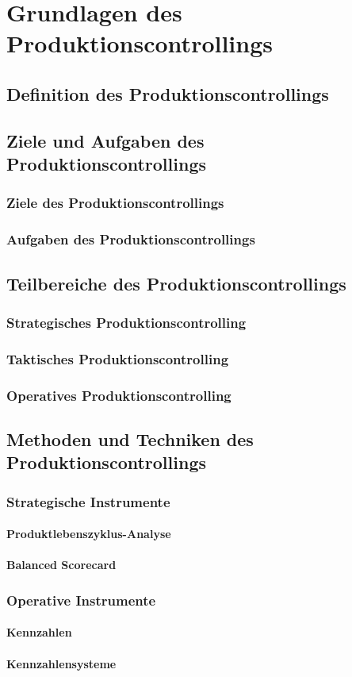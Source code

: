 \section{Grundlagen des Produktionscontrollings}
\subsection{Definition des Produktionscontrollings}
\subsection{Ziele und Aufgaben des Produktionscontrollings}
\subsubsection{Ziele des Produktionscontrollings}
\subsubsection{Aufgaben des Produktionscontrollings}
\subsection{Teilbereiche des Produktionscontrollings}
\subsubsection{Strategisches Produktionscontrolling}
\subsubsection{Taktisches Produktionscontrolling}
\subsubsection{Operatives Produktionscontrolling}
\subsection{Methoden und Techniken des Produktionscontrollings}
\subsubsection{Strategische Instrumente}
\paragraph{Produktlebenszyklus-Analyse}
\paragraph{Balanced Scorecard}
\subsubsection{Operative Instrumente}
\paragraph{Kennzahlen}
\paragraph{Kennzahlensysteme}